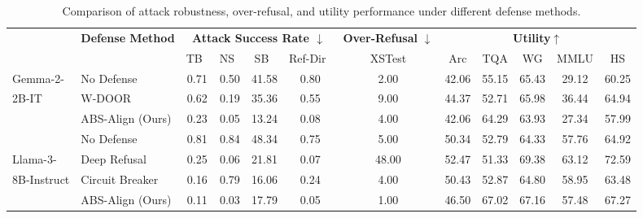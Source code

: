 \begin{table}[htbp]
    \centering
    \setlength{\tabcolsep}{2pt}
    \renewcommand{\arraystretch}{0.9}
    \small
    \caption{Comparison of attack robustness, over-refusal, and utility performance under different defense methods.}
    \label{tab:defense_comparison}
    
    \begin{tabular}{l l cccc c ccccc}
        \toprule
        & \multirow{2}{*}{\textbf{Defense Method}} & \multicolumn{4}{c}{\textbf{Attack Success Rate $\downarrow$}}  & \textbf{Over-Refusal} $\downarrow$ & \multicolumn{5}{c}{\textbf{Utility}$\uparrow$}   \\
        \cmidrule(lr){3-6} \cmidrule(lr){7-7} \cmidrule(lr){8-12}  
        & & TB~\cite{twinbreak} & NS~\cite{wu2026neurostrike} & SB~\cite{xie2025sorrybench} & Ref-Dir~\cite{arditi2024refusal} & XSTest & Arc & TQA & WG & MMLU & HS  \\
        \midrule
        Gemma-2- & No Defense         & 0.71 & 0.50 & 41.58 & 0.80 &   2.00   & 42.06 & 55.15 & 65.43 & 29.12 & 60.25 \\
         2B-IT & W-DOOR~\cite{zhao2025door}                       & 0.62 & 0.19 & 35.36 & 0.55 &  9.00    & 44.37 & 52.71 & 65.98 & 36.44 & 64.94 \\
         & ABS-Align (Ours)                                 & 0.23 & 0.05 & 13.24 & 0.08 &  4.00    & 42.06 & 64.29 & 63.93 & 27.34 & 57.99  \\
        \midrule
        & No Defense                                        & 0.81 & 0.84 & 48.34 & 0.75 &  5.00    & 50.34 & 52.79 & 64.33 & 57.76 & 64.92  \\
        Llama-3- &  Deep Refusal~\cite{deeprefusal}        & 0.25 & 0.06 & 21.81 & 0.07 &   48.00    & 52.47 & 51.33 & 69.38 & 63.12 & 72.59  \\
        8B-Instruct & Circuit Breaker~\cite{zou2024circuit}  & 0.16 & 0.79 & 16.06 & 0.24 &  4.00    & 50.43 & 52.87 & 64.80 & 58.95 & 63.48  \\
        & ABS-Align (Ours)                                  & 0.11 & 0.03 & 17.79 & 0.05 &  1.00   & 46.50 & 67.02 & 67.16 & 57.48 & 67.27  \\
        \bottomrule
        
    \end{tabular}
    
\end{table}